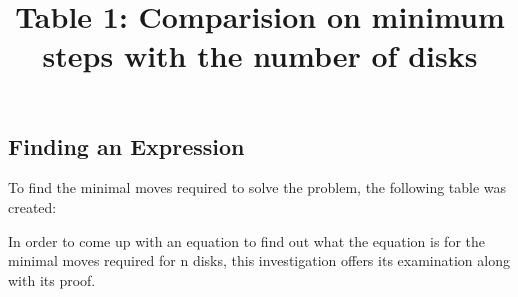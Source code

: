 \documentclass[12pt,a4paper]{article}
\begin{document}
	\subsection{Finding an Expression}
	To find the minimal moves required to solve the problem, the following table was created:
	\begin{table}[H]
		\centering
		\title{Table 1: Comparision on minimum steps with the number of disks}
	\end{table}
	In order to come up with an equation to find out what the equation is for the minimal moves required for n disks, this investigation offers its examination along with its proof. \newpage
\end{document}
